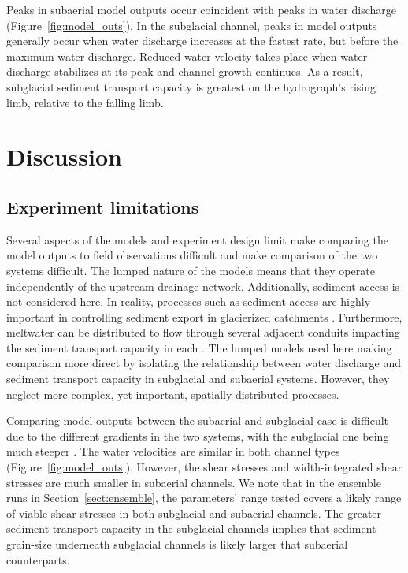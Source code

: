 \documentclass[esurf, manuscript]{copernicus}
\begin{document}
Peaks in subaerial model outputs occur coincident with peaks in water discharge (Figure~\ref{fig:model_outs}).
In the subglacial channel, peaks in model outputs generally occur when water discharge increases at the fastest rate, but before the maximum water discharge.
Reduced water velocity takes place when water discharge stabilizes at its peak and channel growth continues.
As a result, subglacial sediment transport capacity is greatest on the hydrograph's rising limb, relative to the falling limb. 

\FloatBarrier
\section{Discussion}

\subsection{Experiment limitations}

Several aspects of the models and experiment design limit make comparing the model outputs to field observations difficult and make comparison of the two systems difficult.
The lumped nature of the models means that they operate independently of the upstream drainage network.
Additionally, sediment access is not considered here.
In reality, processes such as sediment access are highly important in controlling sediment export in glacierized catchments \citep[e.g.][]{herman2015,vergara2022}.
Furthermore, meltwater can be distributed to flow through several adjacent conduits impacting the sediment transport capacity in each \citep[e.g.][]{werder2013,hewitt2019,delaney2023}.
The lumped models used here making comparison more direct by isolating the relationship between water discharge and sediment transport capacity in subglacial and subaerial systems. 
However, they neglect more complex, yet important, spatially distributed processes. 

Comparing model outputs between the subaerial and subglacial case is difficult due to the different gradients in the two systems, with the subglacial one being much steeper \citep{alley1997}.
The water velocities are similar in both channel types (Figure~\ref{fig:model_outs}).
However, the shear stresses and width-integrated shear stresses are much smaller in subaerial channels.
We note that in the ensemble runs in Section~\ref{sect:ensemble}, the parameters' range tested covers a likely range of viable shear stresses in both subglacial and subaerial channels.
The greater sediment transport capacity in the subglacial channels implies that sediment grain-size underneath subglacial channels is likely larger that subaerial counterparts.
\end{document}
